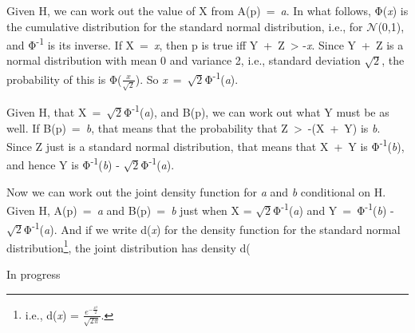 \documentclass[
  10pt,
  letterpaper,
  DIV=11,
  numbers=noendperiod,
  twoside]{scrartcl}
\begin{document}
Given H, we can work out the value of X from A(p)~=~\emph{a}. In what
follows, Φ(\emph{x}) is the cumulative distribution for the standard
normal distribution, i.e., for \(\mathcal{N}\)(0,1), and
Φ\textsuperscript{-1} is its inverse. If X~=~\emph{x}, then p is true
iff Y~+~Z~\textgreater{} -\emph{x}. Since Y~+~Z is a normal distribution
with mean 0 and variance 2, i.e., standard deviation \(\sqrt{2}\), the
probability of this is Φ(\(\frac{x}{\sqrt{2}}\)). So
\emph{x}~=~\(\sqrt{2}\)Φ\textsuperscript{-1}(\emph{a}).

Given H, that X~=~\(\sqrt{2}\)Φ\textsuperscript{-1}(\emph{a}), and B(p),
we can work out what Y must be as well. If B(p)~=~\emph{b}, that means
that the probability that Z~\textgreater~-(X~+~Y) is \emph{b}. Since Z
just is a standard normal distribution, that means that X~+~Y is
Φ\textsuperscript{-1}(\emph{b}), and hence Y is
Φ\textsuperscript{-1}(\emph{b}) -
\(\sqrt{2}\)Φ\textsuperscript{-1}(\emph{a}).

Now we can work out the joint density function for \emph{a} and \emph{b}
conditional on H. Given H, A(p)~=~\emph{a} and B(p)~=~\emph{b} just when
X = \(\sqrt{2}\)Φ\textsuperscript{-1}(\emph{a}) and
Y~=~Φ\textsuperscript{-1}(\emph{b}) -
\(\sqrt{2}\)Φ\textsuperscript{-1}(\emph{a}). And if we write d(\emph{x})
for the density function for the standard normal
distribution\footnote{i.e., d(\emph{x}) =
  \(\frac{e^{-\frac{x^2}{2}}}{\sqrt{2\pi}}\).}, the joint distribution
has density d(



\noindent \vspace{1in} In progress
\end{document}

